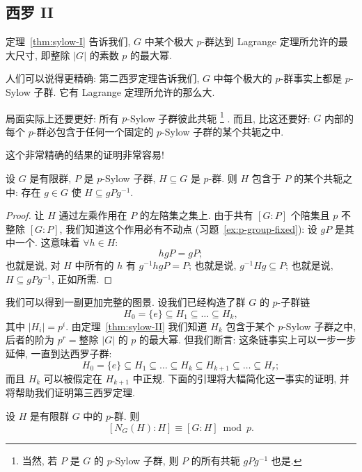 \subsection{西罗 II}
\label{subsec:sylow-II}

定理~\ref{thm:sylow-I} 告诉我们, $G$ 中某个极大 $p$-群达到 Lagrange 定理所允许的最大尺寸, 即整除 $|G|$ 的素数 $p$ 的最大幂.

人们可以说得更精确: 第二西罗定理告诉我们, $G$ 中每个极大的 $p$-群事实上都是 $p$-Sylow 子群. 它有 Lagrange 定理所允许的那么大.

局面实际上还要更好: 所有 $p$-Sylow 子群彼此共轭%
\footnote{当然, 若 $P$ 是 $G$ 的 $p$-Sylow 子群, 则 $P$ 的所有共轭 $gPg^{-1}$ 也是.}%
. 而且, 比这还要好: $G$ 内部的每个 $p$-群必包含于任何一个固定的 $p$-Sylow 子群的某个共轭之中.

这个非常精确的结果的证明非常容易!

\begin{theorem}[第二西罗定理]
\label{thm:sylow-II}
设 $G$ 是有限群, $P$ 是 $p$-Sylow 子群, $H \subseteq G$ 是 $p$-群. 则 $H$ 包含于 $P$ 的某个共轭之中: 存在 $g \in G$ 使 $H \subseteq gPg^{-1}$.
\end{theorem}

\begin{proof}
让 $H$ 通过左乘作用在 $P$ 的左陪集之集上. 由于共有 $[G:P]$ 个陪集且 $p$ 不整除 $[G:P]$, 我们知道这个作用必有不动点 (习题~\ref{ex:p-group-fixed}): 设 $gP$ 是其中一个. 这意味着 $\forall h \in H$:
\[
hgP = gP;
\]
也就是说, 对 $H$ 中所有的 $h$ 有 $g^{-1}hgP = P$; 也就是说, $g^{-1}Hg \subseteq P$; 也就是说, $H \subseteq gPg^{-1}$, 正如所需.
\end{proof}

我们可以得到一副更加完整的图景. 设我们已经构造了群 $G$ 的 $p$-子群链
\[
H_0 = \{e\} \subseteq H_1 \subseteq \dots \subseteq H_k,
\]
其中 $|H_i| = p^i$. 由定理~\ref{thm:sylow-II} 我们知道 $H_k$ 包含于某个 $p$-Sylow 子群之中, 后者的阶为 $p^r = \text{整除 } |G| \text{ 的 } p \text{ 的最大幂}$. 但我们断言: 这条链事实上可以一步一步延伸, 一直到达西罗子群:
\[
H_0 = \{e\} \subseteq H_1 \subseteq \dots \subseteq H_k \subseteq H_{k+1} \subseteq \dots \subseteq H_r;
\]
而且 $H_k$ 可以被假定在 $H_{k+1}$ 中正规. 下面的引理将大幅简化这一事实的证明, 并将帮助我们证明第三西罗定理.

\begin{lemma}
\label{lem:normalizer-congruence}
设 $H$ 是有限群 $G$ 中的 $p$-群. 则
\[
[N_G(H):H] \equiv [G:H] \bmod p.
\]
\end{lemma}

